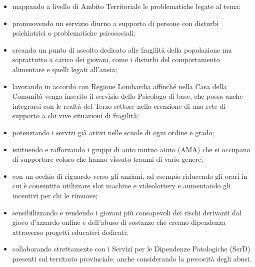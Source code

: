 \begin{bluebox}
\begin{itemize}
  \item mappando a livello di Ambito Territoriale le problematiche legate al tema;
  \item promuovendo un servizio diurno a supporto di persone con disturbi psichiatrici o problematiche psicosociali;
  \item creando un punto di ascolto dedicato alle fragilità della popolazione ma soprattutto a carico dei giovani, come i disturbi del comportamento alimentare e quelli legati all'ansia;
  \item lavorando in accordo con Regione Lombardia affinché nella Casa della Comunità venga inserito il servizio dello Psicologo di base, che possa anche integrarsi con le realtà del Terzo settore nella creazione di una rete di supporto a chi vive situazioni di fragilità;
  \item potenziando i servizi già attivi nelle scuole di ogni ordine e grado;
  \item istituendo e rafforzando i gruppi di auto mutuo aiuto (AMA) che si occupano di supportare coloro che hanno vissuto traumi di vario genere;
\end{itemize}
\end{bluebox}

\begin{bluebox}
\begin{itemize}
  \item con un occhio di riguardo verso gli anziani, ad esempio riducendo gli orari in cui è consentito utilizzare slot machine e videolottery e aumentando gli incentivi per chi le rimuove;
  \item sensibilizzando e rendendo i giovani più consapevoli dei rischi derivanti dal gioco d'azzardo online e dell'abuso di sostanze che creano dipendenza attraverso progetti educativi dedicati;
  \item collaborando strettamente con i Servizi per le Dipendenze Patologiche (SerD) presenti sul territorio provinciale, anche considerando la precocità degli abusi. 
\end{itemize}
\end{bluebox}
